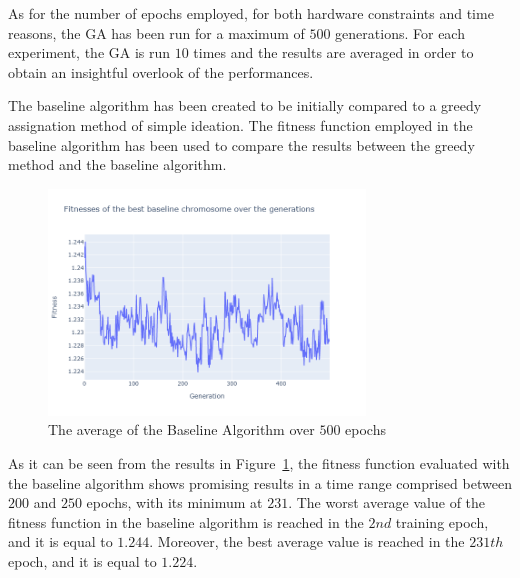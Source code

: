 As for the number of epochs employed, for both hardware constraints and time reasons, the GA has been run for a maximum of $500$ generations.
For each experiment, the GA is run $10$ times and the results are averaged in order to obtain an insightful overlook of the performances.

The baseline algorithm has been created to be initially compared to a greedy assignation method of simple ideation.
The fitness function employed in the baseline algorithm has been used to compare the results between the greedy method and the baseline algorithm.



\begin{figure}[ht]
    \centering
    \includegraphics[width=0.75\textwidth]{../../../Code/Genetic/results/baseline/graphs/pop_size_200/500_epochs/average_fitness.png}
    \caption{The average of the Baseline Algorithm over $500$ epochs}
    \label{fig:average_baseline}
\end{figure}


As it can be seen from the results in Figure~\ref{fig:average_baseline}, the fitness function evaluated with the baseline algorithm shows promising results
in a time range comprised between $200$ and $250$ epochs, with its minimum at $231$.
The worst average value of the fitness function in the baseline algorithm is reached in the $2nd$ training epoch, and it is equal to $1.244$.
Moreover, the best average value is reached in the $231th$ epoch, and it is equal to $1.224$.


